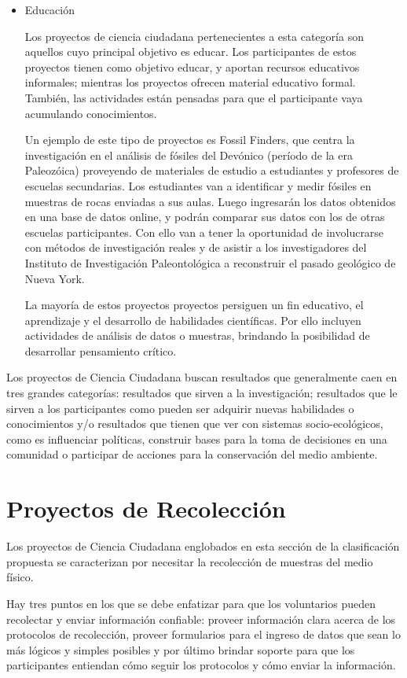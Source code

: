 \begin{itemize}
	\item {Educación} 
	
	Los proyectos de ciencia ciudadana pertenecientes a esta categoría son aquellos cuyo principal objetivo es educar. Los participantes de estos proyectos tienen como objetivo educar, y aportan recursos educativos informales; mientras los proyectos ofrecen material educativo formal. También, las actividades están pensadas para que el participante vaya acumulando conocimientos.
	
	Un ejemplo de este tipo de proyectos es Fossil Finders, que centra la investigación en el análisis de fósiles del Devónico (período de la era Paleozóica) proveyendo de materiales de estudio a estudiantes y profesores de escuelas secundarias. Los estudiantes van a identificar y medir fósiles en muestras de rocas enviadas a sus aulas. Luego ingresarán los datos obtenidos en una base de datos online, y podrán comparar sus datos con los de otras escuelas participantes. Con ello van a tener la oportunidad de involucrarse con métodos de investigación reales y de asistir a los investigadores del Instituto de Investigación Paleontológica a reconstruir el pasado geológico de Nueva York. \cite{FossilFinders}

	La mayoría de estos proyectos proyectos persiguen un fin educativo, el aprendizaje y el desarrollo de habilidades científicas. Por ello incluyen actividades de análisis de datos o muestras, brindando la posibilidad de desarrollar pensamiento crítico. 
	\end{itemize} 
	
	Los proyectos de Ciencia Ciudadana buscan resultados que generalmente caen en tres grandes categorías: resultados que sirven a la investigación; resultados que le sirven a los participantes como pueden ser adquirir nuevas habilidades o conocimientos y/o resultados que tienen que ver con sistemas socio-ecológicos, como es influenciar políticas, construir bases para la toma de decisiones en una comunidad o participar de acciones para la conservación del medio ambiente. \cite{shirk2012public}

\section{Proyectos de Recolección}	 
	Los proyectos de Ciencia Ciudadana englobados en esta sección de la clasificación propuesta se caracterizan por necesitar la recolección de muestras del medio físico.
	
	Hay tres puntos en los que se debe enfatizar para que los voluntarios pueden recolectar y enviar información confiable: proveer información clara acerca de los protocolos de recolección, proveer formularios para el ingreso de datos que sean lo más lógicos y simples posibles y por último brindar soporte para que los participantes entiendan cómo seguir los protocolos y cómo enviar la información.\cite{bonney2009citizen}

